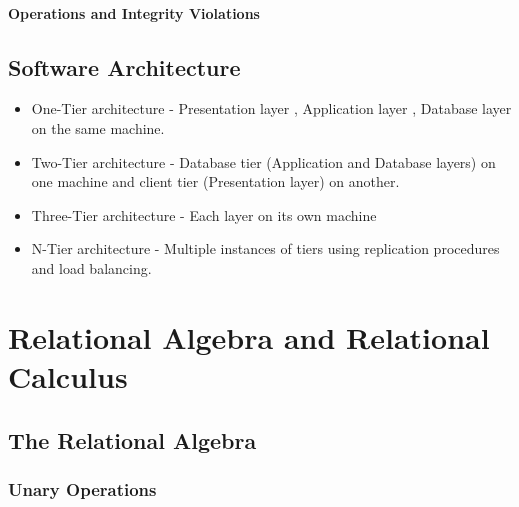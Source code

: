 \documentclass[12pt letter]{report}
\begin{document}
\subsubsection{Operations and Integrity Violations}

\section{Software Architecture}





\begin{itemize}
  \item One-Tier architecture -  Presentation layer , Application layer , Database layer on the same machine.
  \item  Two-Tier architecture - Database tier (Application and Database layers) on one machine and client tier
        (Presentation layer) on another.
  \item Three-Tier architecture - Each layer on its own machine
  \item N-Tier architecture - Multiple instances of tiers using replication procedures and load balancing.
\end{itemize}


\chapter{Relational Algebra and Relational Calculus}

\section{The Relational Algebra}



\subsection{Unary Operations}
\end{document}
